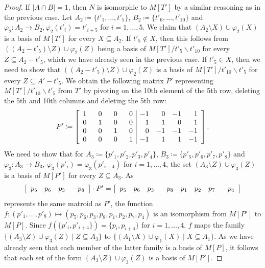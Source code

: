 \documentclass[11pt,a4paper]{article}
\theoremstyle{plain}
\theoremstyle{definition}
\begin{document}
\begin{proof}
If $|A \cap B| = 1$, then $N$ is isomorphic to $M[T']$ by a similar reasoning as in the previous case. Let $A_2 \coloneqq \{t'_1, \dots, t'_5\}$, $B_2 \coloneqq \{t'_6, \dots, t'_{10}\}$ and $\varphi_2 \colon A_2 \to B_2, \varphi_2(t'_i) = t'_{i+5}$ for $i=1,\dots, 5$. We claim that $(A_2 \setminus X) \cup \varphi_2(X)$ is a basis of $M[T']$ for every $X \subseteq A_2$. If $t'_5 \not \in X$, then this follows from $((A_2-t'_5) \setminus Z) \cup \varphi_2(Z)$ being a basis of $M[T'] / t'_5 \backslash t'_{10}$ for every $Z \subseteq A_2-t'_5$, which we have already seen in the previous case. If $t'_5 \in X$, then we need to show that $((A_2-t'_5) \setminus Z) \cup \varphi_2(Z)$ is a basis of $M[T'] / t'_{10} \backslash t'_5$ for every $Z \subseteq A'-t'_5$. We obtain the following matrix $P'$ representing $M[T'] / t'_{10} \backslash t'_5$ from $T'$ by pivoting on the 10th element of the 5th row, deleting the 5th and 10th columns and deleting the 5th row:
\begin{equation*}
P' \coloneqq \left[
\begin{array}{*{4}r|*{4}r}
 1 & ~~0 & ~~0 & ~~0 &   -1 &  0 & -1 &  1 \\
 0 & 1 & 0 & 0 &    1 &  1 &  0 &  1 \\
 0 & 0 & 1 & 0 &    0 & -1 & -1 & -1 \\
 0 & 0 & 0 & 1 &   -1 &  1 &  1 & -1 
\end{array}
\right].
\end{equation*}
We need to show that for $A_3 \coloneqq \{p'_1, p'_2, p'_3, p'_4\}$, $B_3 \coloneqq \{p'_5, p'_6, p'_7, p'_8\}$ and $\varphi_3 \colon A_3 \to B_3$, $\varphi_3(p'_i) = \varphi_3(p'_{i+4})$ for $i=1,\dots,4$, the set $(A_3 \setminus Z) \cup \varphi_3(Z)$ is a basis of $M[P']$ for every $Z \subseteq A_3$. As
\begin{equation*}
\left[\begin{array}{*{4}r} p_5 & p_6 & p_3 & -p_8 \end{array}\right] \cdot P' =
\left[\begin{array}{*{8}r} p_5 & p_6 & p_3 & -p_8 &   p_1 &  p_2 & p_7 & -p_4\end{array}\right]
\end{equation*}
represents the same matroid as $P'$, the function $f \colon  (p'_1,\dots, p'_8) \mapsto (p_5,p_6,p_3,p_8,p_1,p_2,p_7,p_4)$ is an isomorphism from $M[P']$ to $M[P]$. Since $f(\{p'_i,p'_{i+4}\}) = \{p_i,p_{i+4}\}$ for $i=1,\dots,4$, $f$ maps the family $\{(A_3 \setminus Z) \cup \varphi_3(Z) \mid Z \subseteq A_3\}$ to $\{(A_1 \setminus X) \cup \varphi_1(X) \mid X \subseteq A_1\}$. As we have already seen that each member of the latter family is a basis of $M[P]$, it follows that each set of the form $(A_3 \setminus Z) \cup \varphi_3(Z)$ is a basis of $M[P']$. 


\end{proof}
\end{document}
